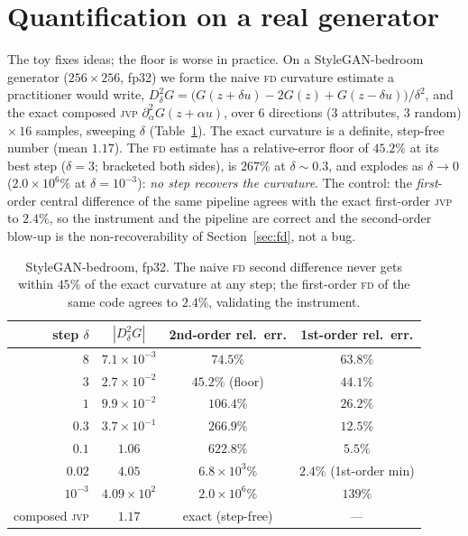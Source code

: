 \documentclass[11pt]{article}
\newcommand{\jvp}{\textsc{jvp}}
\newcommand{\fd}{\textsc{fd}}
\begin{document}
\section{Quantification on a real generator}
\label{sec:stylegan}
The toy fixes ideas; the floor is worse in practice. On a StyleGAN-bedroom
generator ($256{\times}256$, fp32) we form the naive \fd{} curvature estimate a
practitioner would write,
$D^2_\delta G=\big(G(z{+}\delta u)-2G(z)+G(z{-}\delta u)\big)/\delta^2$, and the
exact composed \jvp{} $\partial^2_\alpha G(z{+}\alpha u)$, over $6$ directions
($3$ attributes, $3$ random) $\times\,16$ samples, sweeping $\delta$
(Table~\ref{tab:stylegan}). The exact curvature is a definite, step-free number
(mean $1.17$). The \fd{} estimate has a relative-error floor of $45.2\%$ at its
best step ($\delta=3$; bracketed both sides), is $267\%$ at $\delta\!\sim\!0.3$,
and explodes as $\delta\to0$ ($2.0\times10^{6}\%$ at $\delta=10^{-3}$):
\emph{no step recovers the curvature}. The control: the \emph{first}-order central
difference of the same pipeline agrees with the exact first-order \jvp{} to
$2.4\%$, so the instrument and the pipeline are correct and the second-order
blow-up is the non-recoverability of Section~\ref{sec:fd}, not a bug.

\begin{table}[h]\centering\small
\begin{tabular}{rccc}
\toprule
step $\delta$ & $|D^2_\delta G|$ & 2nd-order rel.\ err. & 1st-order rel.\ err. \\
\midrule
$8$ & $7.1\times10^{-3}$ & $74.5\%$ & $63.8\%$ \\
$3$ & $2.7\times10^{-2}$ & $\mathbf{45.2\%}$ (floor) & $44.1\%$ \\
$1$ & $9.9\times10^{-2}$ & $106.4\%$ & $26.2\%$ \\
$0.3$ & $3.7\times10^{-1}$ & $266.9\%$ & $12.5\%$ \\
$0.1$ & $1.06$ & $622.8\%$ & $5.5\%$ \\
$0.02$ & $4.05$ & $6.8\times10^{3}\%$ & $\mathbf{2.4\%}$ (1st-order min) \\
$10^{-3}$ & $4.09\times10^{2}$ & $2.0\times10^{6}\%$ & $139\%$ \\
\midrule
composed \jvp & $1.17$ & exact (step-free) & --- \\
\bottomrule
\end{tabular}
\caption{StyleGAN-bedroom, fp32. The naive \fd{} second difference never gets
within $45\%$ of the exact curvature at any step; the first-order \fd{} of the
same code agrees to $2.4\%$, validating the instrument.}
\label{tab:stylegan}
\end{table}
\end{document}

